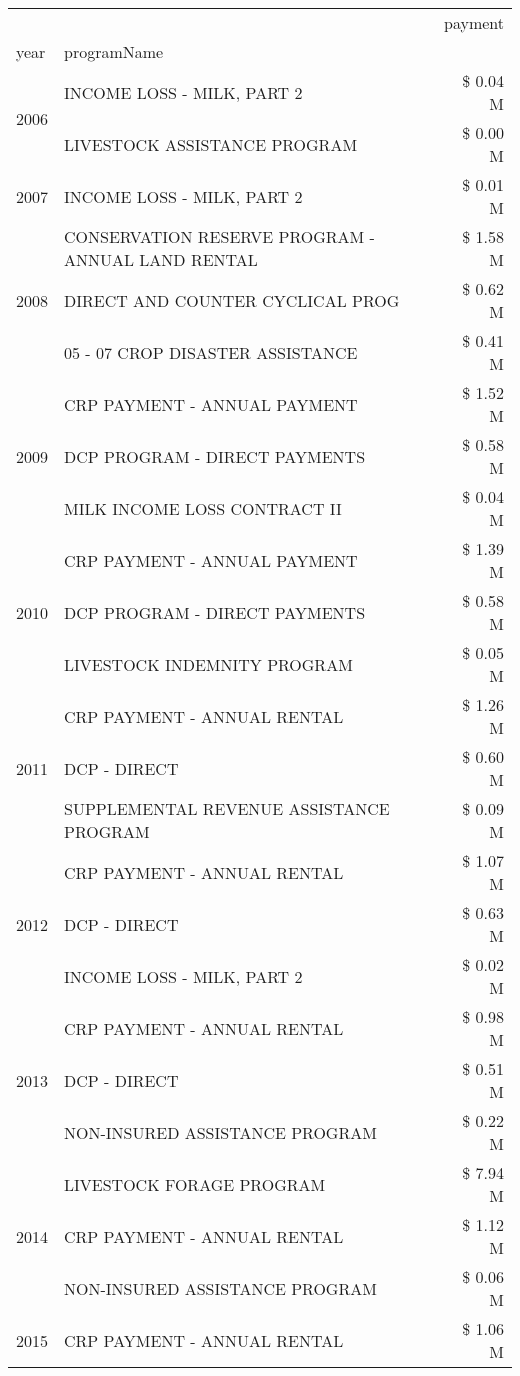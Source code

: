 \begin{tabular}{llr}
\toprule
 &  & payment \\
year & programName &  \\
\midrule
\multirow[t]{2}{*}{2006} & INCOME LOSS - MILK, PART 2 & \$ 0.04 M \\
 & LIVESTOCK ASSISTANCE PROGRAM & \$ 0.00 M \\
\cline{1-3}
2007 & INCOME LOSS - MILK, PART 2 & \$ 0.01 M \\
\cline{1-3}
\multirow[t]{3}{*}{2008} & CONSERVATION RESERVE PROGRAM - ANNUAL LAND RENTAL & \$ 1.58 M \\
 & DIRECT AND COUNTER CYCLICAL PROG & \$ 0.62 M \\
 & 05 - 07 CROP DISASTER ASSISTANCE & \$ 0.41 M \\
\cline{1-3}
\multirow[t]{3}{*}{2009} & CRP PAYMENT - ANNUAL PAYMENT & \$ 1.52 M \\
 & DCP PROGRAM - DIRECT PAYMENTS & \$ 0.58 M \\
 & MILK INCOME LOSS CONTRACT II & \$ 0.04 M \\
\cline{1-3}
\multirow[t]{3}{*}{2010} & CRP PAYMENT - ANNUAL PAYMENT & \$ 1.39 M \\
 & DCP PROGRAM - DIRECT PAYMENTS & \$ 0.58 M \\
 & LIVESTOCK INDEMNITY PROGRAM & \$ 0.05 M \\
\cline{1-3}
\multirow[t]{3}{*}{2011} & CRP PAYMENT - ANNUAL RENTAL & \$ 1.26 M \\
 & DCP - DIRECT & \$ 0.60 M \\
 & SUPPLEMENTAL REVENUE ASSISTANCE PROGRAM & \$ 0.09 M \\
\cline{1-3}
\multirow[t]{3}{*}{2012} & CRP PAYMENT - ANNUAL RENTAL & \$ 1.07 M \\
 & DCP - DIRECT & \$ 0.63 M \\
 & INCOME LOSS - MILK, PART 2 & \$ 0.02 M \\
\cline{1-3}
\multirow[t]{3}{*}{2013} & CRP PAYMENT - ANNUAL RENTAL & \$ 0.98 M \\
 & DCP - DIRECT & \$ 0.51 M \\
 & NON-INSURED ASSISTANCE PROGRAM & \$ 0.22 M \\
\cline{1-3}
\multirow[t]{3}{*}{2014} & LIVESTOCK FORAGE PROGRAM & \$ 7.94 M \\
 & CRP PAYMENT - ANNUAL RENTAL & \$ 1.12 M \\
 & NON-INSURED ASSISTANCE PROGRAM & \$ 0.06 M \\
\cline{1-3}
\multirow[t]{3}{*}{2015} & CRP PAYMENT - ANNUAL RENTAL & \$ 1.06 M \\

\end{tabular}
